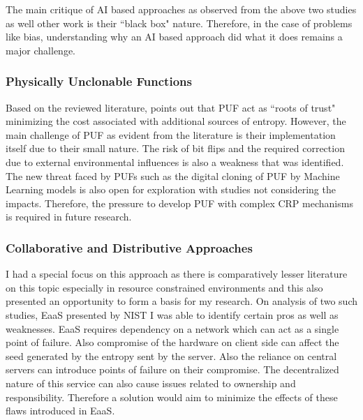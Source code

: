 \documentclass[a4paper, 12pt]{article}
\begin{document}
The main critique of AI based approaches as observed from the above two studies as well other work is their ``black box" nature. Therefore, in the case of problems like bias, understanding why an AI based approach did what it does remains a major challenge.

\subsubsection{Physically Unclonable Functions}
Based on the reviewed literature, \citet{babaei2019puf} points out that \ac{PUF} act as ``roots of trust" minimizing the cost associated with additional sources of entropy. However, the main challenge of \ac{PUF} as evident from the literature is their implementation itself due to their small nature. The risk of bit flips and the required correction due to external environmental influences is also a weakness that was identified. The new threat faced by \ac{PUF}s such as the digital cloning of \ac{PUF} by Machine Learning models \citep{almeer2023puf} is also open for exploration with studies not considering the impacts. Therefore, the pressure to develop \ac{PUF} with complex \ac{CRP} mechanisms is required in future research.

\subsubsection{Collaborative and Distributive Approaches}
I had a special focus on this approach as there is comparatively lesser literature on this topic especially in resource constrained environments and this also presented an opportunity to form a basis for my research. On analysis of two such studies, \ac{EaaS} presented by \ac{NIST} \citep{NIST_EaaS} I was able to identify certain pros as well as weaknesses. \ac{EaaS} requires dependency on a network which can act as a single point of failure. Also compromise of the hardware on client side can affect the seed generated by the entropy sent by the server. Also the reliance on central servers can introduce points of failure on their compromise. The decentralized nature of this service can also cause issues related to ownership and responsibility. Therefore a solution would aim to minimize the effects of these flaws introduced in \ac{EaaS}.
\end{document}
